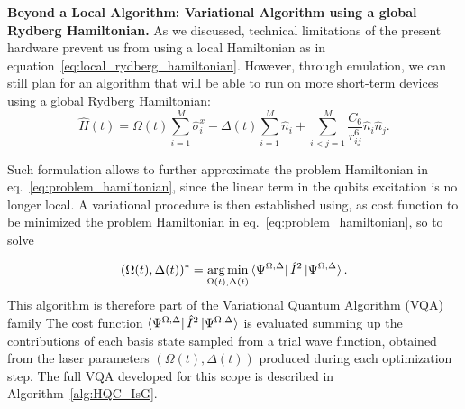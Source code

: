 \documentclass[fleqn,10pt]{wlscirep}
\DeclareMathOperator*{\argmin}{arg\,min}
\begin{document}
\textbf{Beyond a Local Algorithm: Variational Algorithm using a global Rydberg Hamiltonian.} As we discussed, technical limitations of the present hardware prevent us from using a local Hamiltonian as in equation~\eqref{eq:local_rydberg_hamiltonian}. However, through emulation, we can still plan for an algorithm that will be able to run on more short-term devices using a global Rydberg Hamiltonian:
\begin{equation}\label{eq:global_hamiltonian}
    \hat{H}(t) = \Omega(t)\sum_{i=1}^M\hat{\sigma}^x_i - \Delta(t)\sum_{i=1}^M \hat{n}_i +\sum_{i<j=1}^{M} \frac{C_6}{r_{ij}^6} \hat{n}_i \hat{n}_j.
\end{equation}

Such formulation allows to  further approximate the problem Hamiltonian in eq.~\eqref{eq:problem_hamiltonian}, since the linear term in the qubits excitation is no longer local. A variational procedure is then established using, as cost function to be minimized the problem Hamiltonian in eq.~\eqref{eq:problem_hamiltonian}, so to solve

\begin{equation}\label{eq:algorithm-problem}
    (\Omega(t),\Delta(t))^{*}= \displaystyle\argmin_{\Omega(t),\Delta(t)} \bra{\Psi^{\Omega,\Delta}} \hat{I}^2 \ket{\Psi^{\Omega,\Delta}}.
\end{equation}
This algorithm is therefore part of the Variational Quantum Algorithm (VQA) family
The cost function $\bra{\Psi^{\Omega,\Delta}} \hat{I}^2 \ket{\Psi^{\Omega,\Delta}}$ is evaluated summing up the contributions of each basis state sampled from a trial wave function, obtained from the laser parameters $(\Omega(t),\Delta(t))$ produced during each optimization step. The full VQA developed for this scope is described in Algorithm~\ref{alg:HQC_IsG}.
\end{document}

